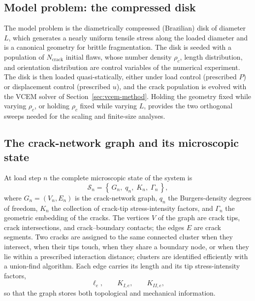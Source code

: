 \documentclass[preprint,12pt]{elsarticle}
\begin{document}
\subsection{Model problem: the compressed disk}
\label{sec:disk}

The model problem is the diametrically compressed (Brazilian) disk of diameter $L$,
which generates a nearly uniform tensile stress along the loaded diameter and is a
canonical geometry for brittle fragmentation. The disk is seeded with a population of
$N_{\mathrm{crack}}$ initial flaws, whose number density $\rho_c$, length
distribution, and orientation distribution are control variables of the numerical
experiment. The disk is then loaded quasi-statically, either under load control
(prescribed $P$) or displacement control (prescribed $u$), and the crack population is
evolved with the VCEM solver of Section~\ref{sec:vcem-method}. Holding the geometry
fixed while varying $\rho_c$, or holding $\rho_c$ fixed while varying $L$, provides
the two orthogonal sweeps needed for the scaling and finite-size analyses.

\subsection{The crack-network graph and its microscopic state}
\label{sec:graph}

At load step $n$ the complete microscopic state of the system is
\begin{equation}
\mathcal{S}_n = \left\{\,G_n,\; q_n,\; K_n,\; \Gamma_n\,\right\},
\label{eq:state}
\end{equation}
where $G_n = (V_n,E_n)$ is the crack-network graph, $q_n$ the Burgers-density degrees
of freedom, $K_n$ the collection of crack-tip stress-intensity factors, and
$\Gamma_n$ the geometric embedding of the cracks. The vertices $V$ of the graph are
crack tips, crack intersections, and crack--boundary contacts; the edges $E$ are crack
segments. Two cracks are assigned to the same connected cluster when they intersect,
when their tips touch, when they share a boundary node, or when they lie within a
prescribed interaction distance; clusters are identified efficiently with a union-find
algorithm. Each edge carries its length and its tip stress-intensity factors,
\begin{equation}
\ell_e, \qquad K_{I,e}, \qquad K_{II,e},
\end{equation}
so that the graph stores both topological and mechanical information.
\end{document}
